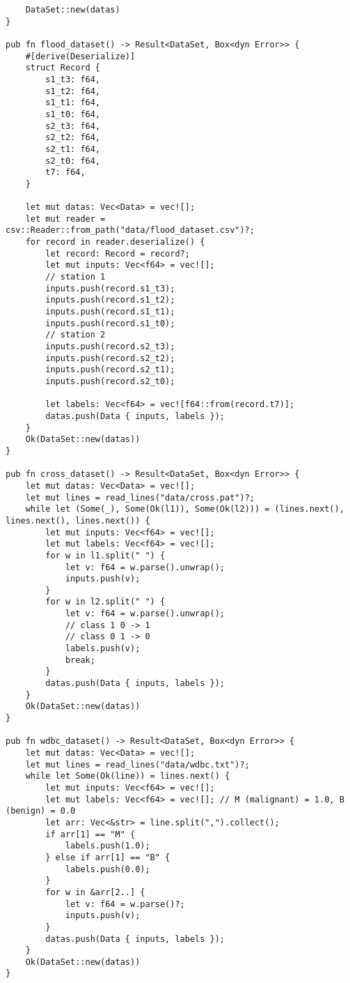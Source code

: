 \begin{code}
\begin{verbatim}
    DataSet::new(datas)
}

pub fn flood_dataset() -> Result<DataSet, Box<dyn Error>> {
    #[derive(Deserialize)]
    struct Record {
        s1_t3: f64,
        s1_t2: f64,
        s1_t1: f64,
        s1_t0: f64,
        s2_t3: f64,
        s2_t2: f64,
        s2_t1: f64,
        s2_t0: f64,
        t7: f64,
    }

    let mut datas: Vec<Data> = vec![];
    let mut reader = csv::Reader::from_path("data/flood_dataset.csv")?;
    for record in reader.deserialize() {
        let record: Record = record?;
        let mut inputs: Vec<f64> = vec![];
        // station 1
        inputs.push(record.s1_t3);
        inputs.push(record.s1_t2);
        inputs.push(record.s1_t1);
        inputs.push(record.s1_t0);
        // station 2
        inputs.push(record.s2_t3);
        inputs.push(record.s2_t2);
        inputs.push(record.s2_t1);
        inputs.push(record.s2_t0);

        let labels: Vec<f64> = vec![f64::from(record.t7)];
        datas.push(Data { inputs, labels });
    }
    Ok(DataSet::new(datas))
}

pub fn cross_dataset() -> Result<DataSet, Box<dyn Error>> {
    let mut datas: Vec<Data> = vec![];
    let mut lines = read_lines("data/cross.pat")?;
    while let (Some(_), Some(Ok(l1)), Some(Ok(l2))) = (lines.next(), lines.next(), lines.next()) {
        let mut inputs: Vec<f64> = vec![];
        let mut labels: Vec<f64> = vec![];
        for w in l1.split(" ") {
            let v: f64 = w.parse().unwrap();
            inputs.push(v);
        }
        for w in l2.split(" ") {
            let v: f64 = w.parse().unwrap();
            // class 1 0 -> 1
            // class 0 1 -> 0
            labels.push(v);
            break;
        }
        datas.push(Data { inputs, labels });
    }
    Ok(DataSet::new(datas))
}

pub fn wdbc_dataset() -> Result<DataSet, Box<dyn Error>> {
    let mut datas: Vec<Data> = vec![];
    let mut lines = read_lines("data/wdbc.txt")?;
    while let Some(Ok(line)) = lines.next() {
        let mut inputs: Vec<f64> = vec![];
        let mut labels: Vec<f64> = vec![]; // M (malignant) = 1.0, B (benign) = 0.0
        let arr: Vec<&str> = line.split(",").collect();
        if arr[1] == "M" {
            labels.push(1.0);
        } else if arr[1] == "B" {
            labels.push(0.0);
        }
        for w in &arr[2..] {
            let v: f64 = w.parse()?;
            inputs.push(v);
        }
        datas.push(Data { inputs, labels });
    }
    Ok(DataSet::new(datas))
}


\end{verbatim}
\end{code}
